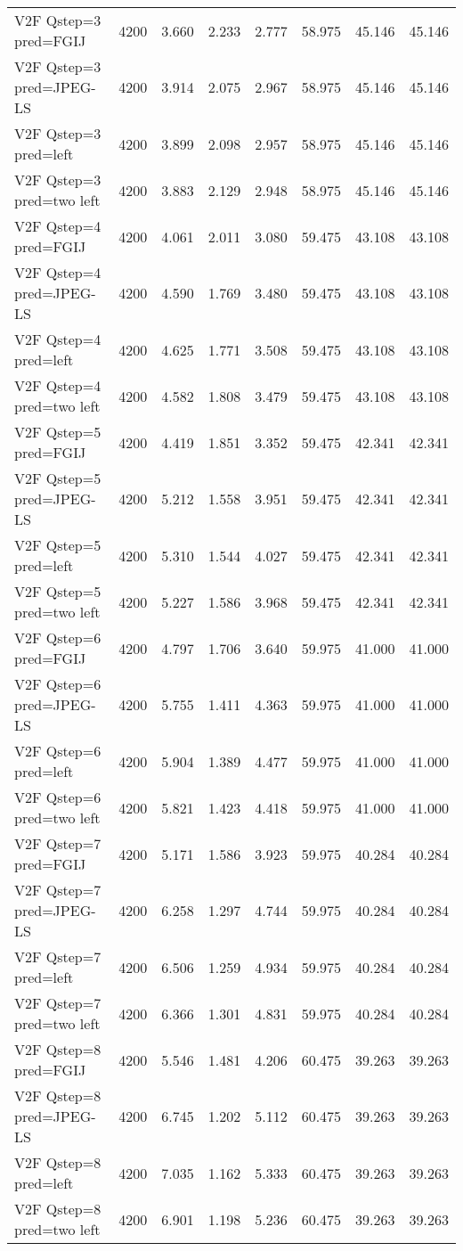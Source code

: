 \begin{tabular}{lrrrrrrr}
V2F Qstep=3 pred=FGIJ & 4200 & 3.660 & 2.233 & 2.777 & 58.975 & 45.146 & 45.146 \\
V2F Qstep=3 pred=JPEG-LS & 4200 & 3.914 & 2.075 & 2.967 & 58.975 & 45.146 & 45.146 \\
V2F Qstep=3 pred=left & 4200 & 3.899 & 2.098 & 2.957 & 58.975 & 45.146 & 45.146 \\
V2F Qstep=3 pred=two left & 4200 & 3.883 & 2.129 & 2.948 & 58.975 & 45.146 & 45.146 \\
V2F Qstep=4 pred=FGIJ & 4200 & 4.061 & 2.011 & 3.080 & 59.475 & 43.108 & 43.108 \\
V2F Qstep=4 pred=JPEG-LS & 4200 & 4.590 & 1.769 & 3.480 & 59.475 & 43.108 & 43.108 \\
V2F Qstep=4 pred=left & 4200 & 4.625 & 1.771 & 3.508 & 59.475 & 43.108 & 43.108 \\
V2F Qstep=4 pred=two left & 4200 & 4.582 & 1.808 & 3.479 & 59.475 & 43.108 & 43.108 \\
V2F Qstep=5 pred=FGIJ & 4200 & 4.419 & 1.851 & 3.352 & 59.475 & 42.341 & 42.341 \\
V2F Qstep=5 pred=JPEG-LS & 4200 & 5.212 & 1.558 & 3.951 & 59.475 & 42.341 & 42.341 \\
V2F Qstep=5 pred=left & 4200 & 5.310 & 1.544 & 4.027 & 59.475 & 42.341 & 42.341 \\
V2F Qstep=5 pred=two left & 4200 & 5.227 & 1.586 & 3.968 & 59.475 & 42.341 & 42.341 \\
V2F Qstep=6 pred=FGIJ & 4200 & 4.797 & 1.706 & 3.640 & 59.975 & 41.000 & 41.000 \\
V2F Qstep=6 pred=JPEG-LS & 4200 & 5.755 & 1.411 & 4.363 & 59.975 & 41.000 & 41.000 \\
V2F Qstep=6 pred=left & 4200 & 5.904 & 1.389 & 4.477 & 59.975 & 41.000 & 41.000 \\
V2F Qstep=6 pred=two left & 4200 & 5.821 & 1.423 & 4.418 & 59.975 & 41.000 & 41.000 \\
V2F Qstep=7 pred=FGIJ & 4200 & 5.171 & 1.586 & 3.923 & 59.975 & 40.284 & 40.284 \\
V2F Qstep=7 pred=JPEG-LS & 4200 & 6.258 & 1.297 & 4.744 & 59.975 & 40.284 & 40.284 \\
V2F Qstep=7 pred=left & 4200 & 6.506 & 1.259 & 4.934 & 59.975 & 40.284 & 40.284 \\
V2F Qstep=7 pred=two left & 4200 & 6.366 & 1.301 & 4.831 & 59.975 & 40.284 & 40.284 \\
V2F Qstep=8 pred=FGIJ & 4200 & 5.546 & 1.481 & 4.206 & 60.475 & 39.263 & 39.263 \\
V2F Qstep=8 pred=JPEG-LS & 4200 & 6.745 & 1.202 & 5.112 & 60.475 & 39.263 & 39.263 \\
V2F Qstep=8 pred=left & 4200 & 7.035 & 1.162 & 5.333 & 60.475 & 39.263 & 39.263 \\
V2F Qstep=8 pred=two left & 4200 & 6.901 & 1.198 & 5.236 & 60.475 & 39.263 & 39.263 \\
\end{tabular}
